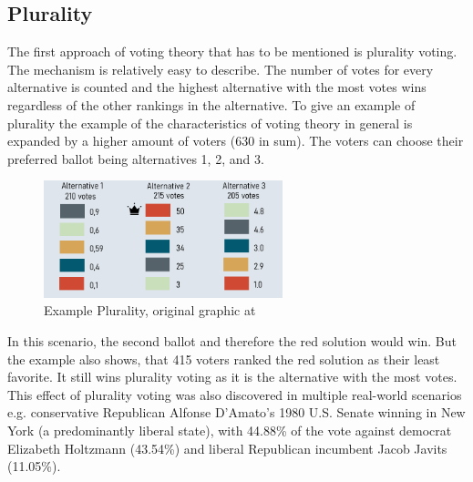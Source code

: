 \documentclass[german, a4paper, 11pt, oneside]{scrbook}
\begin{document}
\subsection{Plurality}
The first approach of voting theory that has to be mentioned is plurality voting. The mechanism is relatively easy to describe. The number of votes for every alternative is counted and the highest alternative with the most votes wins regardless of the other rankings in the alternative. \cite{FelixBrandtVincentConitzerUlleEndrissJeromeLangandArielD.Procaccia.} To give an example of plurality the example of the characteristics of voting theory in general is expanded by a higher amount of voters (630 in sum). The voters can choose their preferred ballot being alternatives 1, 2, and 3.
\begin{figure}[h]
\centering
\includegraphics[height=3.4cm]{Plurality}
\caption{Example Plurality, original graphic at \cite{FelixBrandtVincentConitzerUlleEndrissJeromeLangandArielD.Procaccia.}}
\end{figure}
In this scenario, the second ballot and therefore the red solution would win. But the example also shows, that 415 voters ranked the red solution as their least favorite. It still wins plurality voting as it is the alternative with the most votes.
\\
This effect of plurality voting was also discovered in multiple real-world scenarios e.g. conservative Republican Alfonse D’Amato’s 1980 U.S. Senate winning in New York (a predominantly liberal state), with 44.88\% of the vote against democrat Elizabeth Holtzmann (43.54\%) and liberal Republican incumbent Jacob Javits (11.05\%).\cite{FelixBrandtVincentConitzerUlleEndrissJeromeLangandArielD.Procaccia.}
\end{document}
